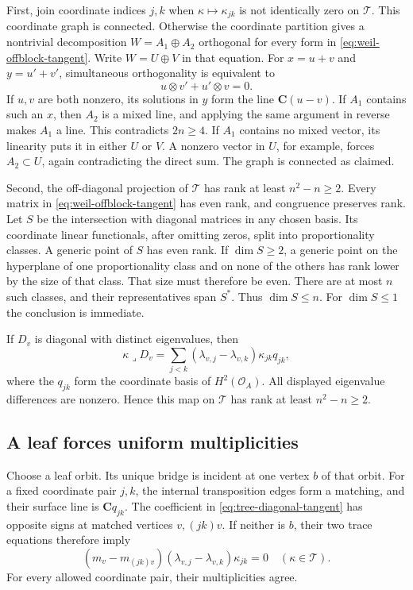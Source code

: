 \documentclass[11pt]{article}
\theoremstyle{definition}
\theoremstyle{remark}
\begin{document}
First, join coordinate indices $j,k$ when
$\kappa\mapsto\kappa_{jk}$ is not identically zero on $\mathcal T$.
This coordinate graph is connected.  Otherwise the coordinate
partition gives a nontrivial decomposition $W=A_1\oplus A_2$
orthogonal for every form in \eqref{eq:weil-offblock-tangent}.
Write $W=U\oplus V$ in that equation.  For $x=u+v$ and
$y=u'+v'$, simultaneous orthogonality is equivalent to
\[
 u\otimes v'+u'\otimes v=0.
\]
If $u,v$ are both nonzero, its solutions in $y$ form the line
$\mathbf C(u-v)$.  If $A_1$ contains such an $x$, then $A_2$ is
a mixed line, and applying the same argument in reverse makes
$A_1$ a line.  This contradicts $2n\ge4$.
If $A_1$ contains no mixed vector, its linearity puts it in either
$U$ or $V$.  A nonzero vector in $U$, for example, forces
$A_2\subset U$, again contradicting the direct sum.  The graph
is connected as claimed.

Second, the off-diagonal projection of $\mathcal T$ has rank at
least $n^2-n\ge2$.  Every matrix in
\eqref{eq:weil-offblock-tangent} has even rank, and congruence
preserves rank.  Let $S$ be the intersection with diagonal
matrices in any chosen basis.  Its coordinate linear functionals,
after omitting zeros, split into proportionality classes.
A generic point of $S$ has even rank.  If $\dim S\ge2$, a generic
point on the hyperplane of one proportionality class and on none
of the others has rank lower by the size of that class.  That size
must therefore be even.  There are at most $n$ such classes,
and their representatives span $S^*$.  Thus $\dim S\le n$.
For $\dim S\le1$ the conclusion is immediate.

If $D_v$ is diagonal with distinct eigenvalues, then
\begin{equation}
 \kappa\lrcorner D_v
  =\sum_{j<k}(\lambda_{v,j}-\lambda_{v,k})
                      \kappa_{jk}q_{jk},
 \label{eq:tree-diagonal-tangent}
\end{equation}
where the $q_{jk}$ form the coordinate basis of $H^2(\mathcal O_A)$.
All displayed eigenvalue differences are nonzero.  Hence this map
on $\mathcal T$ has rank at least $n^2-n\ge2$.

\subsection{A leaf forces uniform multiplicities}

Choose a leaf orbit.  Its unique bridge is incident at one vertex
$b$ of that orbit.  For a fixed coordinate pair $j,k$, the internal
transposition edges form a matching, and their surface line is
$\mathbf Cq_{jk}$.  The coefficient in
\eqref{eq:tree-diagonal-tangent} has opposite signs at matched
vertices $v,(jk)v$.
If neither is $b$, their two trace equations therefore imply
\[
 (m_v-m_{(jk)v})(\lambda_{v,j}-\lambda_{v,k})\kappa_{jk}=0
                  \quad(\kappa\in\mathcal T).
\]
For every allowed coordinate pair, their multiplicities agree.
\end{document}
